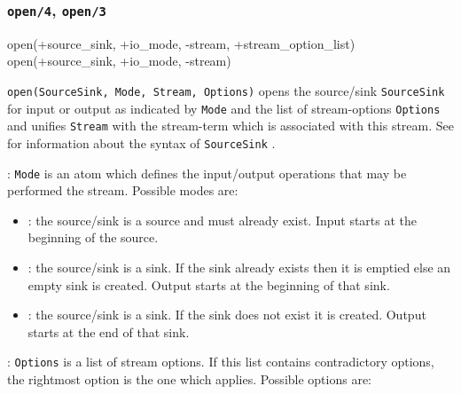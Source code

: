 \subsubsection{\texttt{open/4},
               \texttt{open/3}}
\label{open/4}

\begin{TemplatesOneCol}
open(+source\_sink, +io\_mode, -stream, +stream\_option\_list)\\
open(+source\_sink, +io\_mode, -stream)

\end{TemplatesOneCol}

\Description

\texttt{open(SourceSink, Mode, Stream, Options)} opens the source/sink
\texttt{SourceSink} for input or output as indicated by \texttt{Mode} and
the list of stream-options \texttt{Options} and unifies \texttt{Stream} with
the stream-term which is associated with this stream. See
 for information about the syntax of
\texttt{SourceSink} .

: \texttt{Mode} is an atom which defines the
input/output operations that may be performed the stream. Possible modes
are:

\begin{itemize}

\item {}: the source/sink is a source and must already exist.
Input starts at the beginning of the source. 

\item {}: the source/sink is a sink. If the sink already exists
then it is emptied else an empty sink is created. Output starts at the
beginning of that sink.

\item {}: the source/sink is a sink. If the sink does not exist
it is created. Output starts at the end of that sink.

\end{itemize}

: \texttt{Options} is a list of stream options. If
this list contains contradictory options, the rightmost option is the one
which applies. Possible options are:

